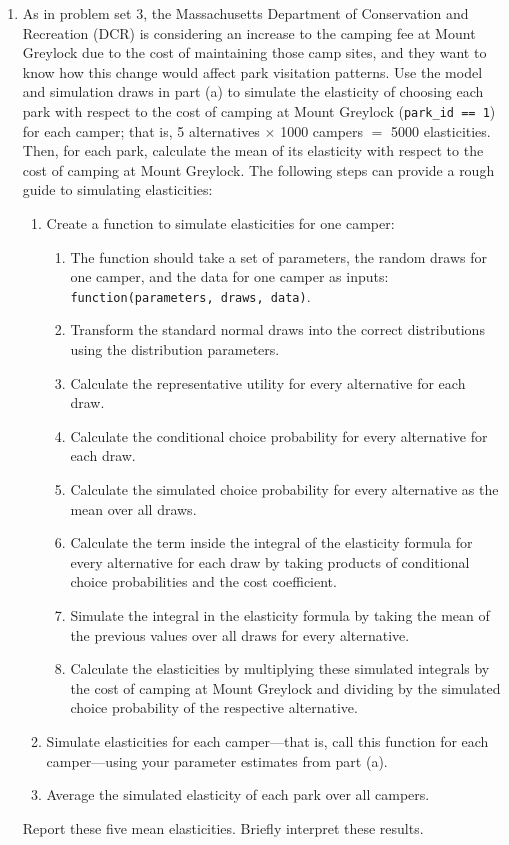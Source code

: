 \documentclass[11pt,letterpaper]{article}\usepackage[]{graphicx}\usepackage[]{color}
\begin{document}
\begin{enumerate}[label=\alph*., leftmargin=*]
	\item As in problem set 3, the Massachusetts Department of Conservation and Recreation (DCR) is considering an increase to the camping fee at Mount Greylock due to the cost of maintaining those camp sites, and they want to know how this change would affect park visitation patterns. Use the model and simulation draws in part (a) to simulate the elasticity of choosing each park with respect to the cost of camping at Mount Greylock (\texttt{park\_id == 1}) for each camper; that is, 5 alternatives $\times$ 1000 campers $=$ 5000 elasticities. Then, for each park, calculate the mean of its elasticity with respect to the cost of camping at Mount Greylock. The following steps can provide a rough guide to simulating elasticities:
	\begin{enumerate}[label=\Roman*.]
		\item Create a function to simulate elasticities for one camper:
		\begin{enumerate}[label=\roman*.]
			\item The function should take a set of parameters, the random draws for one camper, and the data for one camper as inputs: \texttt{function(parameters, draws, data)}.
			\item Transform the standard normal draws into the correct distributions using the distribution parameters.
			\item Calculate the representative utility for every alternative for each draw.
			\item Calculate the conditional choice probability for every alternative for each draw.
			\item Calculate the simulated choice probability for every alternative as the mean over all draws.
			\item Calculate the term inside the integral of the elasticity formula for every alternative for each draw by taking products of conditional choice probabilities and the cost coefficient.
			\item Simulate the integral in the elasticity formula by taking the mean of the previous values over all draws for every alternative.
			\item Calculate the elasticities by multiplying these simulated integrals by the cost of camping at Mount Greylock and dividing by the simulated choice probability of the respective alternative.
		\end{enumerate}
		\item Simulate elasticities for each camper---that is, call this function for each camper---using your parameter estimates from part (a).
		\item Average the simulated elasticity of each park over all campers.
	\end{enumerate}
	Report these five mean elasticities. Briefly interpret these results.


\end{enumerate}
\end{document}
